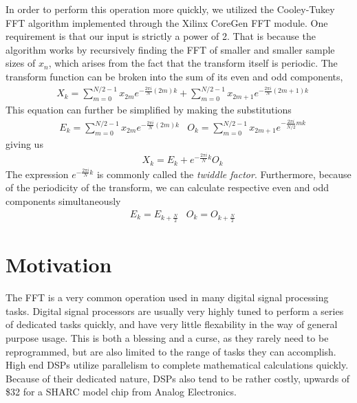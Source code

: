 \documentclass[12pt]{article}
\begin{document}
    In order to perform this operation more quickly, we utilized the Cooley-Tukey FFT algorithm implemented through the Xilinx CoreGen FFT module.
    One requirement is that our input is strictly a power of 2.
    That is because the algorithm works by recursively finding the FFT of smaller and smaller sample sizes of $x_n$, which arises from the fact that the transform itself is periodic.
    The transform function can be broken into the sum of its even and odd components,
    \begin{align*}
        &X_k = \sum \limits_{m=0}^{N/2-1} x_{2m}e^{-\frac{2\pi i}{N} (2m)k} + \sum \limits_{m=0}^{N/ 2-1} x_{2m+1} e^{-\frac{2\pi i}{N} (2m+1)k}
    \end{align*}
    This equation can further be simplified by making the substitutions
    \begin{align*}
        &E_k = \sum \limits_{m=0}^{N/2-1} x_{2m}e^{-\frac{2\pi i}{N} (2m)k}
        &O_k = \sum \limits_{m=0}^{N/2-1} x_{2m+1} e^{-\frac{2\pi i}{N/2} mk}
    \end{align*}
    giving us
    \begin{align*}
        &X_k = E_k + e^{-\frac{2\pi i}{N} k} O_k
    \end{align*}
    The expression $e^{-\frac{2\pi i}{N}k}$ is commonly called the \textit{twiddle factor}.
    Furthermore, because of the periodicity of the transform, we can calculate respective even and   odd components simultaneously
    \begin{align*}
        &E_k = E_{k+\frac{N}{2}}
        &O_k = O_{k+\frac{N}{2}}
    \end{align*}
  
  \section*{Motivation}
    The FFT is a very common operation used in many digital signal processing tasks.
    Digital signal processors are usually very highly tuned to perform a series of dedicated tasks quickly, and have very little flexability in the way of general purpose usage.
    This is both a blessing and a curse, as they rarely need to be reprogrammed, but are also limited to the range of tasks they can accomplish.
    High end DSPs utilize parallelism to complete mathematical calculations quickly.
    Because of their dedicated nature, DSPs also tend to be rather costly, upwards of \$32 for a SHARC model chip from Analog Electronics.\\
\end{document}
